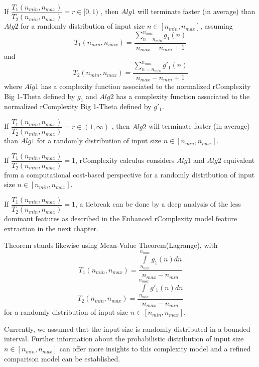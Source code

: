 \begin{theorem}
    If $ \dfrac{T_{1}(n_{min}, n_{max})}{T_{2}(n_{min}, n_{max})} = r \in [0,1) $ , then $Alg1$ will terminate faster (in average) than $Alg2$ for a randomly distribution of input size $n \in [n_{min}, n_{max}]$, assuming \[T_{1}(n_{min}, n_{max}) = \dfrac{\sum\limits_{n=n_{min}}^{n_{max}} g_{1}(n)}{n_{max} - n_{min} + 1}\] and \[T_{2}(n_{min}, n_{max}) = \dfrac{\sum\limits_{n=n_{min}}^{n_{max}} g'_{1}(n)}{n_{max} - n_{min} + 1}\] where $Alg1$ has a complexity function associated to the normalized rComplexity Big 1-Theta defined by $g_{1}$ and $Alg2$ has a complexity function associated to the normalized rComplexity Big 1-Theta defined by $g'_{1}$.
\end{theorem}

\begin{corollary}
    If $ \dfrac{T_{1}(n_{min}, n_{max})}{T_{2}(n_{min}, n_{max})} = r \in (1,\infty) $ , then $Alg2$ will terminate faster (in average) than $Alg1$ for a randomly distribution of input size $n \in [n_{min}, n_{max}]$.
\end{corollary}

\begin{remark}
    If  $ \dfrac{T_{1}(n_{min}, n_{max})}{T_{2}(n_{min}, n_{max})} = 1$, rComplexity calculus considers $Alg1$ and $Alg2$ equivalent from a computational cost-based perspective for a randomly distribution of input size $n \in [n_{min}, n_{max}]$.
\end{remark}

\begin{remark}
    If  $ \dfrac{T_{1}(n_{min}, n_{max})}{T_{2}(n_{min}, n_{max})} = 1$, a tiebreak can be done by a deep analysis of the less dominant features as described in the Enhanced rComplexity model feature extraction in the next chapter.
\end{remark}

\begin{remark}
    Theorem stands likewise using Mean-Value Theorem(Lagrange), with
    \[  T_{1}(n_{min}, n_{max}) = \dfrac{\int\limits_{n_{min}}^{n_{max}} g_{1}(n) dn}{n_{max} - n_{min}}  \]
    \[  T_{2}(n_{min}, n_{max}) = \dfrac{\int\limits_{n_{min}}^{n_{max}} g'_{1}(n) dn}{n_{max} - n_{min}}  \]
    for a randomly distribution of input size $n \in [n_{min}, n_{max}]$.
\end{remark}

Currently, we assumed that the input size is randomly distributed in a bounded interval. Further information about the probabilistic distribution of input size $n \in [n_{min}, n_{max}]$ can offer more insights to this complexity model and a refined comparison model can be established.

